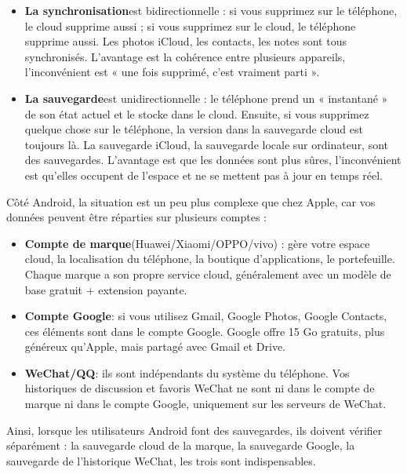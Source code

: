 \begin{itemize}
  \item \textbf{La synchronisation}est bidirectionnelle : si vous supprimez sur le téléphone, le cloud supprime aussi ; si vous supprimez sur le cloud, le téléphone supprime aussi. Les photos iCloud, les contacts, les notes sont tous synchronisés. L'avantage est la cohérence entre plusieurs appareils, l'inconvénient est « une fois supprimé, c'est vraiment parti ».
  \item \textbf{La sauvegarde}est unidirectionnelle : le téléphone prend un « instantané » de son état actuel et le stocke dans le cloud. Ensuite, si vous supprimez quelque chose sur le téléphone, la version dans la sauvegarde cloud est toujours là. La sauvegarde iCloud, la sauvegarde locale sur ordinateur, sont des sauvegardes. L'avantage est que les données sont plus sûres, l'inconvénient est qu'elles occupent de l'espace et ne se mettent pas à jour en temps réel.
\end{itemize}


Côté Android, la situation est un peu plus complexe que chez Apple, car vos données peuvent être réparties sur plusieurs comptes :

\begin{itemize}
  \item \textbf{Compte de marque}(Huawei/Xiaomi/OPPO/vivo) : gère votre espace cloud, la localisation du téléphone, la boutique d'applications, le portefeuille. Chaque marque a son propre service cloud, généralement avec un modèle de base gratuit + extension payante.
  \item \textbf{Compte Google}: si vous utilisez Gmail, Google Photos, Google Contacts, ces éléments sont dans le compte Google. Google offre 15 Go gratuits, plus généreux qu'Apple, mais partagé avec Gmail et Drive.
  \item \textbf{WeChat/QQ}: ils sont indépendants du système du téléphone. Vos historiques de discussion et favoris WeChat ne sont ni dans le compte de marque ni dans le compte Google, uniquement sur les serveurs de WeChat.
\end{itemize}

Ainsi, lorsque les utilisateurs Android font des sauvegardes, ils doivent vérifier séparément : la sauvegarde cloud de la marque, la sauvegarde Google, la sauvegarde de l'historique WeChat, les trois sont indispensables.


